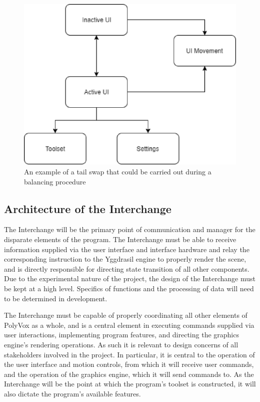 \documentclass[onecolumn, draftclsnofoot,10pt, compsoc]{IEEEtran}
\begin{document}
\begin{figure}[H]
\begin{center}
\includegraphics[width=\textwidth]{UIDiagram.eps}
\caption{An example of a tail swap that could be carried out during a balancing procedure}
\end{center}
\end{figure}

\subsection{Architecture of the Interchange}
The Interchange will be the primary point of communication and manager for the disparate elements of the program. The Interchange must be able to receive information supplied via the user interface and interface hardware and relay the corresponding instruction to the Yggdrasil engine to properly render the scene, and is directly responsible for directing state transition of all other components. Due to the experimental nature of the project, the design of the Interchange must be kept at a high level. Specifics of functions and the processing of data will need to be determined in development. 

The Interchange must be capable of properly coordinating all other elements of PolyVox as a whole, and is a central element  in executing commands supplied via user interactions, implementing program features, and directing the graphics engine’s rendering operations. As such it is relevant to design concerns of all stakeholders involved in the project. In particular, it is central to the operation of the user interface and motion controls, from which it will receive user commands, and the operation of the graphics engine, which it will send commands to. As the Interchange will be the point at which the program’s toolset is constructed, it will also dictate the program’s available features.
\end{document}
